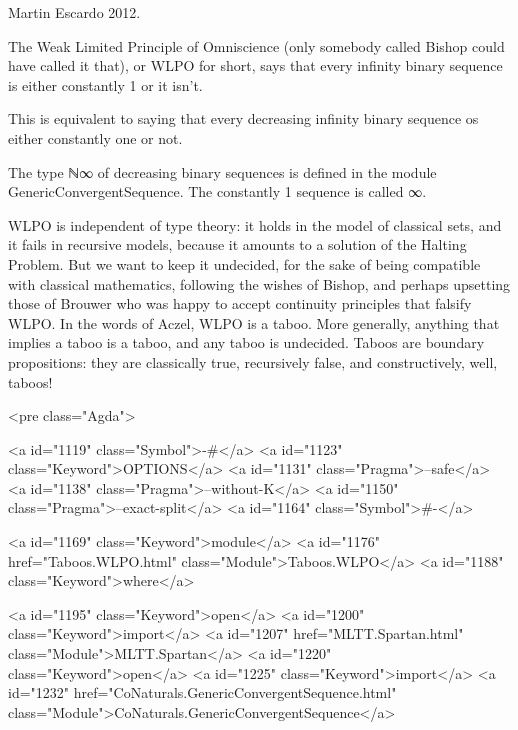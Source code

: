 Martin Escardo 2012.

The Weak Limited Principle of Omniscience (only somebody called Bishop
could have called it that), or WLPO for short, says that every
infinity binary sequence is either constantly 1 or it isn't.

This is equivalent to saying that every decreasing infinity binary
sequence os either constantly one or not.

The type ℕ∞ of decreasing binary sequences is defined in the module
GenericConvergentSequence. The constantly 1 sequence is called ∞.

WLPO is independent of type theory: it holds in the model of classical
sets, and it fails in recursive models, because it amounts to a
solution of the Halting Problem. But we want to keep it undecided, for
the sake of being compatible with classical mathematics, following the
wishes of Bishop, and perhaps upsetting those of Brouwer who was happy
to accept continuity principles that falsify WLPO. In the words of
Aczel, WLPO is a taboo.  More generally, anything that implies a taboo
is a taboo, and any taboo is undecided. Taboos are boundary
propositions: they are classically true, recursively false, and
constructively, well, taboos!

<pre class="Agda">

<a id="1119" class="Symbol">{-#</a> <a id="1123" class="Keyword">OPTIONS</a> <a id="1131" class="Pragma">--safe</a> <a id="1138" class="Pragma">--without-K</a> <a id="1150" class="Pragma">--exact-split</a> <a id="1164" class="Symbol">#-}</a>

<a id="1169" class="Keyword">module</a> <a id="1176" href="Taboos.WLPO.html" class="Module">Taboos.WLPO</a> <a id="1188" class="Keyword">where</a>

<a id="1195" class="Keyword">open</a> <a id="1200" class="Keyword">import</a> <a id="1207" href="MLTT.Spartan.html" class="Module">MLTT.Spartan</a>
<a id="1220" class="Keyword">open</a> <a id="1225" class="Keyword">import</a> <a id="1232" href="CoNaturals.GenericConvergentSequence.html" class="Module">CoNaturals.GenericConvergentSequence</a>

